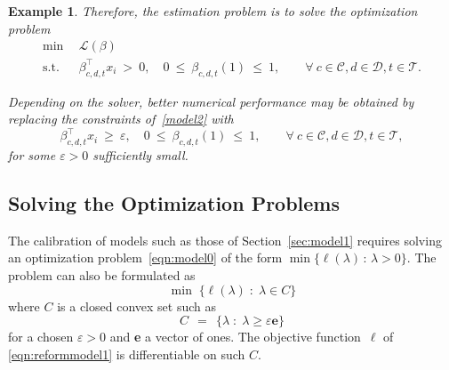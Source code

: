 \documentclass[article]{jss}
\newtheorem{example}{Example}[section]
\begin{document}
\begin{example}
Therefore, the estimation problem is to solve the optimization problem
\begin{equation}
\label{model2}
\begin{array}{rl}
\min & \ \ \mathscr{L}(\beta) \\
\mbox{s.t.} & \ \ \beta_{c,d,t}^{\top} x_{i} \ > \ 0,
\quad 0 \ \leq \ \beta_{c,d,t}(1) \ \leq \ 1,
\qquad \forall \ c \in \mathcal{C}, d \in \mathcal{D}, t \in \mathcal{T}.
\end{array}
\end{equation}




\fi

Depending on the solver, better numerical performance may be obtained by replacing the constraints of~\eqref{model2} with
\begin{equation}
\label{feassetref1b}
\beta_{c,d,t}^{\top} x_{i} \ \geq \ \varepsilon,
\quad 0 \ \leq \ \beta_{c,d,t}(1) \ \leq \ 1,
\qquad \forall \ c \in \mathcal{C}, d \in \mathcal{D}, t \in \mathcal{T},
\end{equation}
for some $\varepsilon > 0$ sufficiently small.
\end{example}


\subsection{Solving the Optimization Problems}
\label{sec:opt_sol}

The calibration of models such as those of Section~\ref{sec:model1} requires solving an optimization problem~\eqref{eqn:model0} of the form $\min\{\ell(\lambda) \, : \, \lambda > 0\}$.
The problem can also be formulated as
\begin{equation}
\label{eqn:reformmodel1}
\min \; \{\ell(\lambda) \; : \; \lambda \in C\}
\end{equation}
where $C$ is a closed convex set such as
\begin{equation}
\label{eqn:Ceps}
C \ \ = \ \ \{\lambda \; : \; \lambda \geq \varepsilon \textbf{e}\}
\end{equation}
for a chosen $\varepsilon > 0$ and \textbf{e} a vector of ones.
The objective function~$\ell$ of \eqref{eqn:reformmodel1} is differentiable on such $C$.
\end{document}
